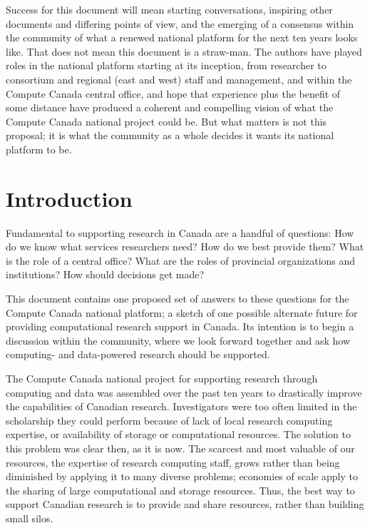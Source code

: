 \documentclass[11pt, letterpaper, twoside]{article}
\begin{document}
\begin{executive}
Success for this document will mean starting conversations, inspiring
other documents and differing points of view, and the emerging of a
consensus within the community of what a renewed national platform for
the next ten years looks like. That does not mean this document is a
straw-man. The authors have played roles in the national platform
starting at its inception, from researcher to consortium and regional
(east and west) staff and management, and within the Compute Canada
central office, and hope that experience plus the benefit of some
distance have produced a coherent and compelling vision of what the
Compute Canada national project could be. But what matters is not this
proposal; it is what the community as a whole decides it wants its
national platform to be.
\end{executive} 

\newpage
\listofproposal
\newpage
\tableofcontents

\cleardoublepage
{}

\section*{Introduction} 
%

Fundamental to supporting research in Canada are a handful of questions:
How do we know what services researchers need? How do we best provide
them? What is the role of a central office? What are the roles of
provincial organizations and institutions? How should decisions get
made?

This document contains one proposed set of answers to these questions
for the Compute Canada national platform; a sketch of one possible
alternate future for providing computational research support in Canada.
Its intention is to begin a discussion within the community, where we
look forward together and ask how computing- and data-powered research
should be supported.

The Compute Canada national project for supporting research through
computing and data was assembled over the past ten years to drastically
improve the capabilities of Canadian research. Investigators were too
often limited in the scholarship they could perform because of lack of
local research computing expertise, or availability of storage or
computational resources. The solution to this problem was clear then, as
it is now.  The scarcest and most valuable of our resources, the
expertise of research computing staff, grows rather than being
diminished by applying it to many diverse problems; economies of scale
apply to the sharing of large computational and storage resources. Thus,
the best way to support Canadian research is to provide and share
resources, rather than building small silos.
\end{document}
